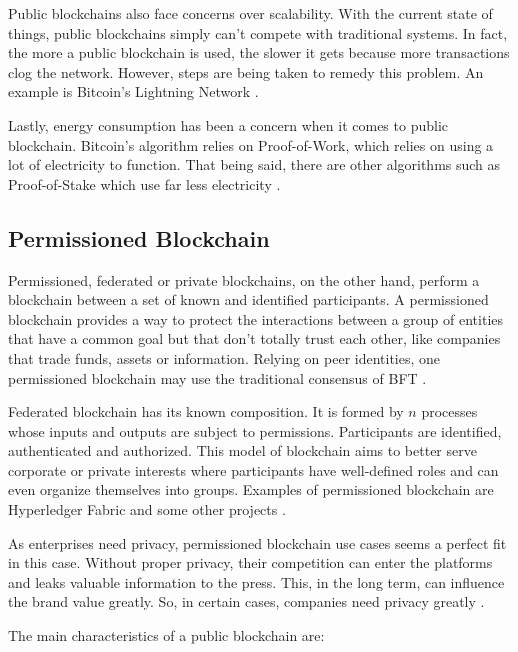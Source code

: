 Public blockchains also face concerns over scalability. With the current state of things, public blockchains simply can’t compete with traditional systems. In fact, the more a public blockchain is used, the slower it gets because more transactions clog the network. However, steps are being taken to remedy this problem. An example is Bitcoin’s Lightning Network \cite{selfkeyOrg}.

Lastly, energy consumption has been a concern when it comes to public blockchain. Bitcoin’s algorithm relies on Proof-of-Work, which relies on using a lot of electricity to function. That being said, there are other algorithms such as Proof-of-Stake which use far less electricity \cite{selfkeyOrg}. 


\subsection{Permissioned Blockchain}\label{sec:blockchainPrivada}
Permissioned, federated or private blockchains, on the other hand, perform a blockchain between a set of known and identified participants. A permissioned blockchain provides a way to protect the interactions between a group of entities that have a common goal but that don't totally trust each other, like companies that trade funds, assets or information. Relying on peer identities, one permissioned blockchain may use the traditional consensus of \acf{BFT} \cite{androulaki2018hyperledger}.

Federated blockchain has its known composition. It is formed by $n$ processes whose inputs and outputs are subject to permissions. Participants are identified, authenticated and authorized. This model of blockchain aims to better serve corporate or private interests where participants have well-defined roles and can even organize themselves into groups. Examples of permissioned blockchain are Hyperledger Fabric \cite{cachin2016architecture} and some other projects \cite{cachin2017blockchain}.

As enterprises need privacy, permissioned blockchain use cases seems a perfect fit in this case. Without proper privacy, their competition can enter the platforms and leaks valuable information to the press. This, in the long term, can influence the brand value greatly. So, in certain cases, companies need privacy greatly \cite{101blockchains}.

The main characteristics of a public blockchain are:

